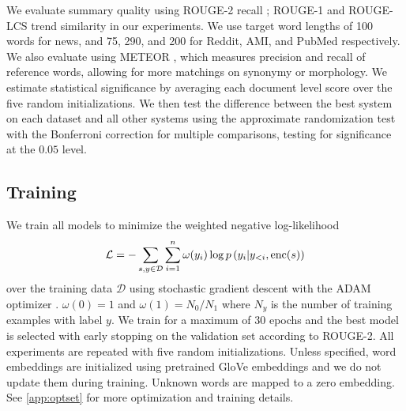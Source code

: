 
We evaluate summary quality using ROUGE-2 recall \cite{lin2004rouge};
ROUGE-1 and ROUGE-LCS trend similarity in our experiments.
We use target word lengths of 100 words for news, and 
75, 290, and 200 for Reddit, AMI, and PubMed respectively.
We also evaluate using METEOR \cite{denkowski:lavie:meteor-wmt:2014},
which measures precision and recall of reference words, allowing for
more matchings on synonymy or morphology.
We estimate statistical significance by averaging each document level score
over the five random initializations.
We then test the difference between the best system on each dataset and 
all other systems using the approximate randomization test 
\cite{riezler2005some} with the Bonferroni correction for multiple comparisons,
testing for significance at the $0.05$ level. 

\subsection{Training}

We train all models to minimize the weighted negative log-likelihood
\[\mathcal{L} = -\sum_{s,y\in \mathcal{D}} \sum_{i=1}^\docSize \omega(y_i) \log p\left(y_i|y_{<i},
\operatorname{enc}(\sent)\right)\]
over the training data $\mathcal{D}$
using stochastic gradient descent with the ADAM optimizer
\cite{kingma2014adam}.
$\omega(0)=1$ and $\omega(1) = N_0/N_1$ where $N_y$ is the number of 
training examples with label $y$.
    We train for a maximum of 30 epochs and the best
    model is selected with early stopping on the validation set according
    to ROUGE-2. All experiments are repeated with five random
    initializations.     Unless specified, word embeddings are initialized 
    using pretrained GloVe embeddings \cite{pennington2014glove} and we do 
    not update them during training. Unknown words are mapped to a zero 
    embedding.
    See \autoref{app:optset} for more optimization and training details.

